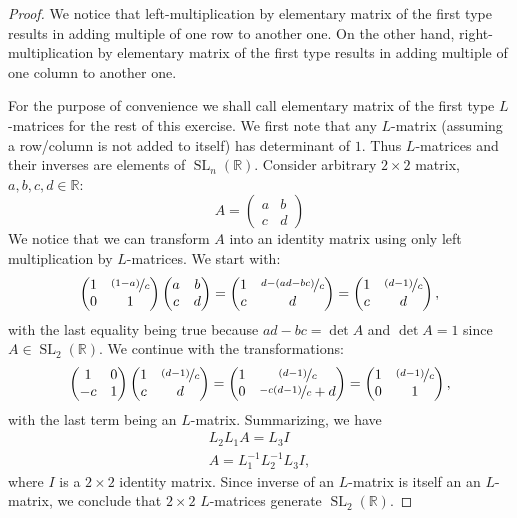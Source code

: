 \documentclass{article}
\newcommand{\R}{\mathbb{R}}
\newcommand{\SL}[2]{\operatorname{SL}_{#1}(#2)}
\newcommand{\SLnR}{\SL{n}{\R}}
\begin{document}
\begin{proof}

We notice that left-multiplication by elementary matrix of the first type results in adding multiple of one row to another one. On the other hand, right-multiplication by elementary matrix of the first type results in adding multiple of one column to another one.

For the purpose of convenience we shall call elementary matrix of the first type $L$-matrices for the rest of this exercise.
We first note that any $L$-matrix (assuming a row/column is not added to itself) has determinant of $1$.
Thus $L$-matrices and their inverses are elements of $\SLnR$.
Consider arbitrary $2 \times 2$ matrix, $a,b,c,d \in \mathbb{R}$:
\[ A =
\begin{pmatrix}
	a & b \\
	c & d
\end{pmatrix}
\]
We notice that we can transform $A$ into an identity matrix using only left multiplication by $L$-matrices. We start with:
\[
\begin{pmatrix}
	1 & \nicefrac{(1-a)}{c} \\
	0 & 1
\end{pmatrix}
\begin{pmatrix}
	a & b \\
	c & d
\end{pmatrix}
=
\begin{pmatrix}
	1 & \nicefrac{d-(ad-bc)}{c} \\
	c & d
\end{pmatrix}
=
\begin{pmatrix}
	1 & \nicefrac{(d-1)}{c} \\
	c & d
\end{pmatrix},
\]
with the last equality being true because $ad-bc = \det A$ and $\det A = 1$ since $A \in \SL{2}{\R}$.
We continue with the transformations:
\[
\begin{pmatrix}
	1 & 0 \\
	-c & 1
\end{pmatrix}
\begin{pmatrix}
	1 & \nicefrac{(d-1)}{c} \\
	c & d
\end{pmatrix}
=
\begin{pmatrix}
	1 & \nicefrac{(d-1)}{c} \\
	0 & \nicefrac{-c(d-1)}{c} + d
\end{pmatrix}
=
\begin{pmatrix}
	1 & \nicefrac{(d-1)}{c} \\
	0 & 1
\end{pmatrix},
\]
with the last term being an $L$-matrix.
Summarizing, we have
\begin{gather*}
    L_2 L_1 A = L_3 I \\
    A = L_1^{-1} L_2^{-1} L_3 I,
\end{gather*}
where $I$ is a $2 \times 2$ identity matrix.
Since inverse of an $L$-matrix is itself an an $L$-matrix, we conclude that $2 \times 2$ $L$-matrices generate $\SL{2}{\R}$.


\end{proof}
\end{document}
